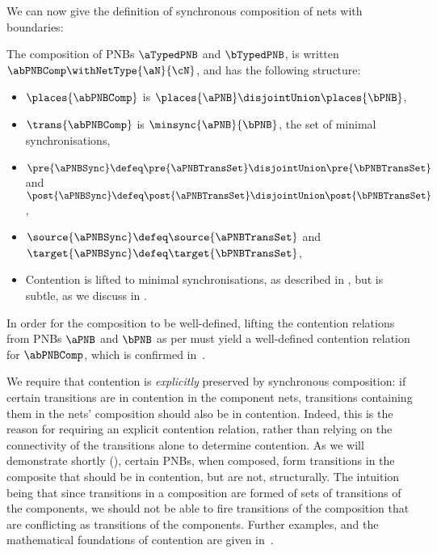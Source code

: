 We can now give the definition of synchronous composition of nets with
boundaries:

\begin{definition}\label{defn:sequentialCompositionPNB}
The composition of PNBs $\aTypedPNB$ and $\bTypedPNB$, is written $\abPNBComp
\withNetType{\aN}{\cN}$, and has the following structure:
\begin{itemize}
    \item $\places{\abPNBComp}$ is $\places{\aPNB} \disjointUnion
        \places{\bPNB}$,
    \item $\trans{\abPNBComp}$ is $\minsync{\aPNB}{\bPNB}$, the set of minimal
        synchronisations,
    \item $\pre{\aPNBSync} \defeq \pre{\aPNBTransSet} \disjointUnion
        \pre{\bPNBTransSet}$ and $\post{\aPNBSync} \defeq \post{\aPNBTransSet}
        \disjointUnion \post{\bPNBTransSet}$,
    \item $\source{\aPNBSync} \defeq \source{\aPNBTransSet}$ and
        $\target{\aPNBSync} \defeq \target{\bPNBTransSet}$,
    \item Contention is lifted to minimal synchronisations, as described in
        , but is subtle, as we discuss in
        .
\end{itemize}
\end{definition}

In order for the composition to be well-defined, lifting the contention
relations from PNBs $\aPNB$ and $\bPNB$ as per 
must yield a well-defined contention relation for $\abPNBComp$, which is
confirmed in~\cite[Definition 3.4]{Bruni2013}.

\begin{remark}\label{rem:contentionpreserved}
    We require that contention is \emph{explicitly} preserved by synchronous
    composition: if certain transitions are in contention in the component
    nets, transitions containing them in the nets' composition should also be
    in contention. Indeed, this is the reason for requiring an explicit
    contention relation, rather than relying on the connectivity of the
    transitions alone to determine contention. As we will demonstrate shortly
    (), certain PNBs, when
    composed, form transitions in the composite that should be in contention,
    but are not, structurally. The intuition being that since transitions in a
    composition are formed of sets of transitions of the components, we should
    not be able to fire transitions of the composition that are conflicting as
    transitions of the components. Further examples, and the mathematical
    foundations of contention are given
    in~\cite{Sobocinski2013a}.
\end{remark}

